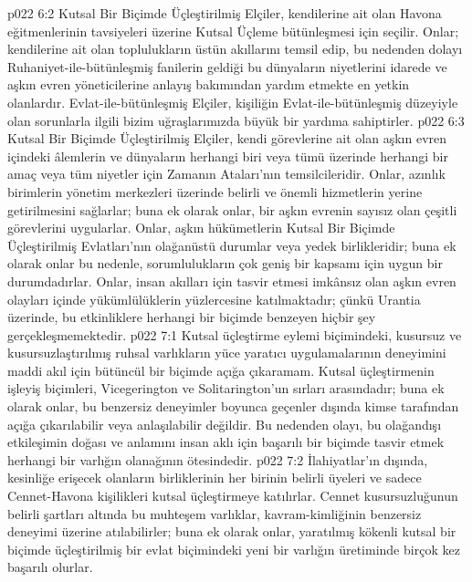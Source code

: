 \vs p022 6:2 Kutsal Bir Biçimde Üçleştirilmiş Elçiler, kendilerine ait olan Havona eğitmenlerinin tavsiyeleri üzerine Kutsal Üçleme bütünleşmesi için seçilir. Onlar; kendilerine ait olan toplulukların üstün akıllarını temsil edip, bu nedenden dolayı Ruhaniyet\hyp{}ile\hyp{}bütünleşmiş fanilerin geldiği bu dünyaların niyetlerini idarede ve aşkın evren yöneticilerine anlayış bakımından yardım etmekte en yetkin olanlardır. Evlat\hyp{}ile\hyp{}bütünleşmiş Elçiler, kişiliğin Evlat\hyp{}ile\hyp{}bütünleşmiş düzeyiyle olan sorunlarla ilgili bizim uğraşlarımızda büyük bir yardıma sahiptirler.
\vs p022 6:3 Kutsal Bir Biçimde Üçleştirilmiş Elçiler, kendi görevlerine ait olan aşkın evren içindeki âlemlerin ve dünyaların herhangi biri veya tümü üzerinde herhangi bir amaç veya tüm niyetler için Zamanın Ataları’nın temsilcileridir. Onlar, azınlık birimlerin yönetim merkezleri üzerinde belirli ve önemli hizmetlerin yerine getirilmesini sağlarlar; buna ek olarak onlar, bir aşkın evrenin sayısız olan çeşitli görevlerini uygularlar. Onlar, aşkın hükümetlerin Kutsal Bir Biçimde Üçleştirilmiş Evlatları’nın olağanüstü durumlar veya yedek birlikleridir; buna ek olarak onlar bu nedenle, sorumlulukların çok geniş bir kapsamı için uygun bir durumdadırlar. Onlar, insan akılları için tasvir etmesi imkânsız olan aşkın evren olayları içinde yükümlülüklerin yüzlercesine katılmaktadır; çünkü Urantia üzerinde, bu etkinliklere herhangi bir biçimde benzeyen hiçbir şey gerçekleşmemektedir.
\vs p022 7:1 Kutsal üçleştirme eylemi biçimindeki, kusursuz ve kusursuzlaştırılmış ruhsal varlıkların yüce yaratıcı uygulamalarının deneyimini maddi akıl için bütüncül bir biçimde açığa çıkaramam. Kutsal üçleştirmenin işleyiş biçimleri, Vicegerington ve Solitarington’un sırları arasındadır; buna ek olarak onlar, bu benzersiz deneyimler boyunca geçenler dışında kimse tarafından açığa çıkarılabilir veya anlaşılabilir değildir. Bu nedenden olayı, bu olağandışı etkileşimin doğası ve anlamını insan aklı için başarılı bir biçimde tasvir etmek herhangi bir varlığın olanağının ötesindedir.
\vs p022 7:2 İlahiyatlar’ın dışında, kesinliğe erişecek olanların birliklerinin her birinin belirli üyeleri ve sadece Cennet\hyp{}Havona kişilikleri kutsal üçleştirmeye katılırlar. Cennet kusursuzluğunun belirli şartları altında bu muhteşem varlıklar, kavram\hyp{}kimliğinin benzersiz deneyimi üzerine atılabilirler; buna ek olarak onlar, yaratılmış kökenli kutsal bir biçimde üçleştirilmiş bir evlat biçimindeki yeni bir varlığın üretiminde birçok kez başarılı olurlar.
